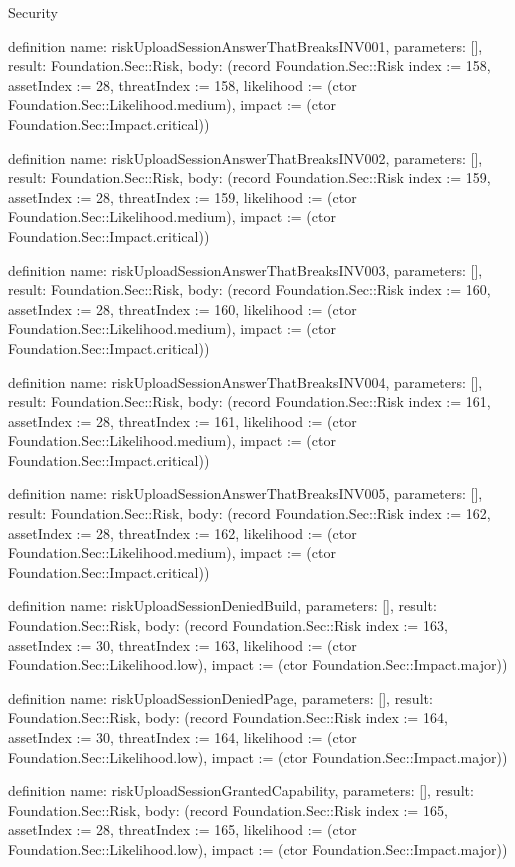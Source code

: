 \begin{lexlean}{Security}
\begin{semanticmodule}
definition{
  name: riskUploadSessionAnswerThatBreaksINV001,
  parameters: [],
  result: Foundation.Sec::Risk,
  body: (record Foundation.Sec::Risk {index := 158, assetIndex := 28, threatIndex := 158, likelihood := (ctor Foundation.Sec::Likelihood.medium), impact := (ctor Foundation.Sec::Impact.critical)})
}

definition{
  name: riskUploadSessionAnswerThatBreaksINV002,
  parameters: [],
  result: Foundation.Sec::Risk,
  body: (record Foundation.Sec::Risk {index := 159, assetIndex := 28, threatIndex := 159, likelihood := (ctor Foundation.Sec::Likelihood.medium), impact := (ctor Foundation.Sec::Impact.critical)})
}

definition{
  name: riskUploadSessionAnswerThatBreaksINV003,
  parameters: [],
  result: Foundation.Sec::Risk,
  body: (record Foundation.Sec::Risk {index := 160, assetIndex := 28, threatIndex := 160, likelihood := (ctor Foundation.Sec::Likelihood.medium), impact := (ctor Foundation.Sec::Impact.critical)})
}

definition{
  name: riskUploadSessionAnswerThatBreaksINV004,
  parameters: [],
  result: Foundation.Sec::Risk,
  body: (record Foundation.Sec::Risk {index := 161, assetIndex := 28, threatIndex := 161, likelihood := (ctor Foundation.Sec::Likelihood.medium), impact := (ctor Foundation.Sec::Impact.critical)})
}

definition{
  name: riskUploadSessionAnswerThatBreaksINV005,
  parameters: [],
  result: Foundation.Sec::Risk,
  body: (record Foundation.Sec::Risk {index := 162, assetIndex := 28, threatIndex := 162, likelihood := (ctor Foundation.Sec::Likelihood.medium), impact := (ctor Foundation.Sec::Impact.critical)})
}

definition{
  name: riskUploadSessionDeniedBuild,
  parameters: [],
  result: Foundation.Sec::Risk,
  body: (record Foundation.Sec::Risk {index := 163, assetIndex := 30, threatIndex := 163, likelihood := (ctor Foundation.Sec::Likelihood.low), impact := (ctor Foundation.Sec::Impact.major)})
}

definition{
  name: riskUploadSessionDeniedPage,
  parameters: [],
  result: Foundation.Sec::Risk,
  body: (record Foundation.Sec::Risk {index := 164, assetIndex := 30, threatIndex := 164, likelihood := (ctor Foundation.Sec::Likelihood.low), impact := (ctor Foundation.Sec::Impact.major)})
}

definition{
  name: riskUploadSessionGrantedCapability,
  parameters: [],
  result: Foundation.Sec::Risk,
  body: (record Foundation.Sec::Risk {index := 165, assetIndex := 28, threatIndex := 165, likelihood := (ctor Foundation.Sec::Likelihood.low), impact := (ctor Foundation.Sec::Impact.major)})
}


\end{semanticmodule}
\end{lexlean}
